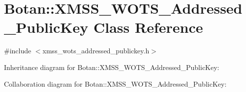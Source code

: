 \hypertarget{class_botan_1_1_x_m_s_s___w_o_t_s___addressed___public_key}{}\section{Botan\+:\+:X\+M\+S\+S\+\_\+\+W\+O\+T\+S\+\_\+\+Addressed\+\_\+\+Public\+Key Class Reference}
\label{class_botan_1_1_x_m_s_s___w_o_t_s___addressed___public_key}


{\ttfamily \#include $<$xmss\+\_\+wots\+\_\+addressed\+\_\+publickey.\+h$>$}



Inheritance diagram for Botan\+:\+:X\+M\+S\+S\+\_\+\+W\+O\+T\+S\+\_\+\+Addressed\+\_\+\+Public\+Key\+:


Collaboration diagram for Botan\+:\+:X\+M\+S\+S\+\_\+\+W\+O\+T\+S\+\_\+\+Addressed\+\_\+\+Public\+Key\+:
